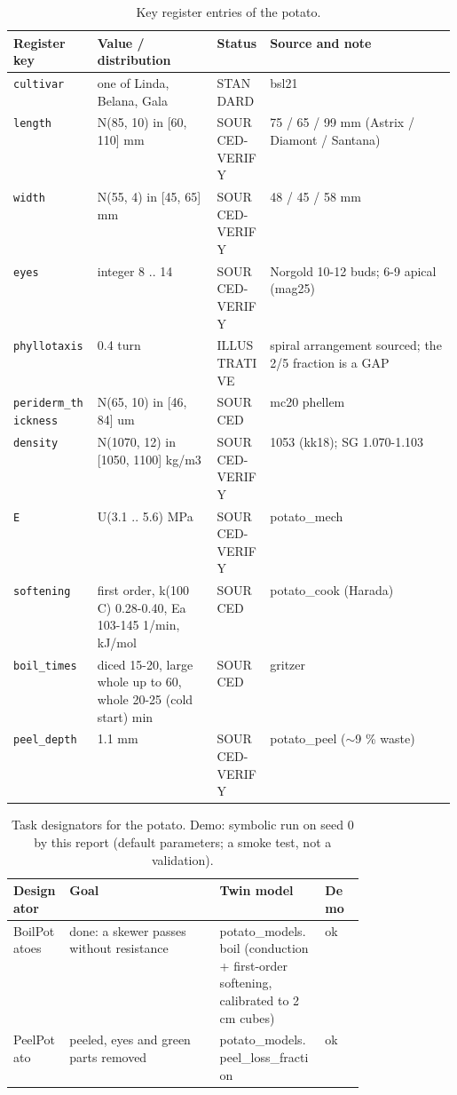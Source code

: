 \documentclass[10.5pt,a4paper]{article}
\begin{document}
\begin{table}[htbp]\centering\scriptsize\caption{Key register entries of the potato.}
\begin{tabularx}{\linewidth}{@{}p{0.19\linewidth}p{0.27\linewidth}p{0.12\linewidth}X@{}}\toprule Register key & Value / distribution & Status & Source and note \\\midrule
\texttt{cultivar} & one of Linda, Belana, Gala & STANDARD & bsl21 \\
\texttt{length} & N(85, 10) in [60, 110] mm & SOURCED-VERIFY & 75 / 65 / 99 mm (Astrix / Diamont / Santana) \\
\texttt{width} & N(55, 4) in [45, 65] mm & SOURCED-VERIFY & 48 / 45 / 58 mm \\
\texttt{eyes} & integer 8 .. 14 & SOURCED-VERIFY & Norgold 10-12 buds; 6-9 apical (mag25) \\
\texttt{phyllotaxis} & 0.4 turn & ILLUSTRATIVE & spiral arrangement sourced; the 2/5 fraction is a GAP \\
\texttt{periderm\_\allowbreak{}thickness} & N(65, 10) in [46, 84] um & SOURCED & mc20 phellem \\
\texttt{density} & N(1070, 12) in [1050, 1100] kg/m3 & SOURCED-VERIFY & 1053 (kk18); SG 1.070-1.103 \\
\texttt{E} & U(3.1 .. 5.6) MPa & SOURCED-VERIFY & potato\_mech \\
\texttt{softening} & first order, k(100 C) 0.28-0.40, Ea 103-145 1/min, kJ/mol & SOURCED & potato\_cook (Harada) \\
\texttt{boil\_\allowbreak{}times} & diced 15-20, large whole up to 60, whole 20-25 (cold start) min & SOURCED & gritzer \\
\texttt{peel\_\allowbreak{}depth} & 1.1 mm & SOURCED-VERIFY & potato\_peel ($\sim$9 \% waste) \\\bottomrule\end{tabularx}\end{table}
\begin{table}[htbp]\centering\scriptsize\caption{Task designators for the potato. Demo: symbolic run on seed 0 by this report (default parameters; a smoke test, not a validation).}
\begin{tabularx}{\linewidth}{@{}p{0.16\linewidth}Xp{0.3\linewidth}l@{}}\toprule Designator & Goal & Twin model & Demo \\\midrule
BoilPotatoes & done: a skewer passes without resistance & potato\_models.boil (conduction + first-order softening, calibrated to 2 cm cubes) & ok \\
PeelPotato & peeled, eyes and green parts removed & potato\_models.peel\_loss\_fraction & ok \\\bottomrule\end{tabularx}\end{table}
\end{document}
